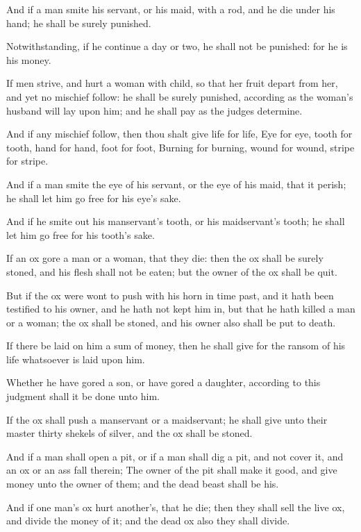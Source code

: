 \verse And if a man smite his servant, or his maid, with a rod, and he
die under his hand; he shall be surely punished.

\verse Notwithstanding, if he continue a day or two, he shall not be
punished: for he is his money.

\verse If men strive, and hurt a woman with child, so that her fruit
depart from her, and yet no mischief follow: he shall be surely
punished, according as the woman's husband will lay upon him; and he
shall pay as the judges determine.

\verse And if any mischief follow, then thou shalt give life for life,
\verse Eye for eye, tooth for tooth, hand for hand, foot for foot,
\verse Burning for burning, wound for wound, stripe for stripe.

\verse And if a man smite the eye of his servant, or the eye of his
maid, that it perish; he shall let him go free for his eye's sake.

\verse And if he smite out his manservant's tooth, or his maidservant's
tooth; he shall let him go free for his tooth's sake.

\verse If an ox gore a man or a woman, that they die: then the ox shall
be surely stoned, and his flesh shall not be eaten; but the owner of
the ox shall be quit.

\verse But if the ox were wont to push with his horn in time past, and
it hath been testified to his owner, and he hath not kept him in, but
that he hath killed a man or a woman; the ox shall be stoned, and his
owner also shall be put to death.

\verse If there be laid on him a sum of money, then he shall give for
the ransom of his life whatsoever is laid upon him.

\verse Whether he have gored a son, or have gored a daughter, according
to this judgment shall it be done unto him.

\verse If the ox shall push a manservant or a maidservant; he shall
give unto their master thirty shekels of silver, and the ox shall be
stoned.

\verse And if a man shall open a pit, or if a man shall dig a pit, and
not cover it, and an ox or an ass fall therein; \verse The owner of the
pit shall make it good, and give money unto the owner of them; and the
dead beast shall be his.

\verse And if one man's ox hurt another's, that he die; then they shall
sell the live ox, and divide the money of it; and the dead ox also
they shall divide.

